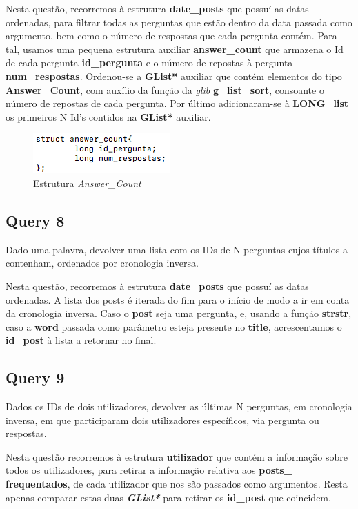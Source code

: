 \documentclass[a4paper]{article}
\begin{document}
Nesta questão, recorremos à estrutura \textbf{date\_posts} que possuí 
as datas ordenadas, para filtrar todas as perguntas que estão dentro da 
data passada como argumento, bem como o número de respostas que cada 
pergunta contém. Para tal, usamos uma pequena estrutura auxiliar
\textbf{answer\_count} que armazena o Id de cada pergunta \textbf{id\_pergunta}
e o número de repostas à pergunta \textbf{num\_respostas}. Ordenou-se a 
\textbf{GList*} auxiliar que contém elementos do tipo \textbf{Answer\_Count}, 
com auxílio da função da \textit{glib} \textbf{g\_list\_sort}, consoante o 
número de repostas de cada pergunta. Por último adicionaram-se à 
\textbf{LONG\_list} os primeiros N Id's contidos na \textbf{GList*} auxiliar.

\begin{figure}[H]
\centering
\includegraphics[scale=0.70]{image_answer_count}
\caption{Estrutura \textit{Answer\_Count}}
\label{img:answer_count}
\end{figure}

\newpage 

\subsection{Query 8}

Dado uma palavra, devolver uma lista com os IDs de N perguntas
cujos títulos a contenham, ordenados por cronologia inversa.

Nesta questão, recorremos à estrutura \textbf{date\_posts} que possuí 
as datas ordenadas. A lista dos posts é iterada do fim para o início
de modo a ir em conta da cronologia inversa. Caso o \textbf{post} seja 
uma pergunta, e, usando a função \textbf{strstr}, caso a \textbf{word}
passada como parâmetro esteja presente no \textbf{title}, acrescentamos
o \textbf{id\_post} à lista a retornar no final.

\subsection{Query 9}

Dados os IDs de dois utilizadores, devolver as últimas N perguntas, em
cronologia inversa, em que participaram dois utilizadores específicos, 
via pergunta ou respostas.

Nesta questão recorremos à estrutura \textbf{utilizador} que contém a 
informação sobre todos os utilizadores, para retirar a informação relativa 
aos \textbf{posts\_} \textbf{frequentados}, de cada utilizador que nos são 
passados como argumentos. Resta apenas comparar estas duas 
\textit{\textbf{GList*}} para retirar os \textbf{id\_post} que coincidem.
\end{document}
